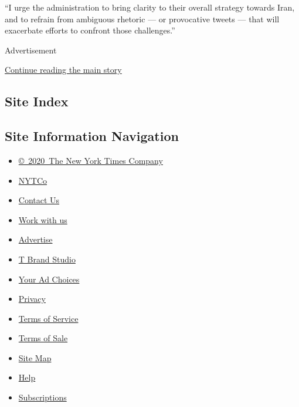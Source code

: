 ``I urge the administration to bring clarity to their overall strategy
towards Iran, and to refrain from ambiguous rhetoric --- or provocative
tweets --- that will exacerbate efforts to confront those challenges.''

Advertisement

\protect\hyperlink{after-bottom}{Continue reading the main story}

\hypertarget{site-index}{%
\subsection{Site Index}\label{site-index}}

\hypertarget{site-information-navigation}{%
\subsection{Site Information
Navigation}\label{site-information-navigation}}

\begin{itemize}
\tightlist
\item
  \href{https://help.nytimes3xbfgragh.onion/hc/en-us/articles/115014792127-Copyright-notice}{©~2020~The
  New York Times Company}
\end{itemize}

\begin{itemize}
\tightlist
\item
  \href{https://www.nytco.com/}{NYTCo}
\item
  \href{https://help.nytimes3xbfgragh.onion/hc/en-us/articles/115015385887-Contact-Us}{Contact
  Us}
\item
  \href{https://www.nytco.com/careers/}{Work with us}
\item
  \href{https://nytmediakit.com/}{Advertise}
\item
  \href{http://www.tbrandstudio.com/}{T Brand Studio}
\item
  \href{https://www.nytimes3xbfgragh.onion/privacy/cookie-policy\#how-do-i-manage-trackers}{Your
  Ad Choices}
\item
  \href{https://www.nytimes3xbfgragh.onion/privacy}{Privacy}
\item
  \href{https://help.nytimes3xbfgragh.onion/hc/en-us/articles/115014893428-Terms-of-service}{Terms
  of Service}
\item
  \href{https://help.nytimes3xbfgragh.onion/hc/en-us/articles/115014893968-Terms-of-sale}{Terms
  of Sale}
\item
  \href{https://spiderbites.nytimes3xbfgragh.onion}{Site Map}
\item
  \href{https://help.nytimes3xbfgragh.onion/hc/en-us}{Help}
\item
  \href{https://www.nytimes3xbfgragh.onion/subscription?campaignId=37WXW}{Subscriptions}
\end{itemize}
